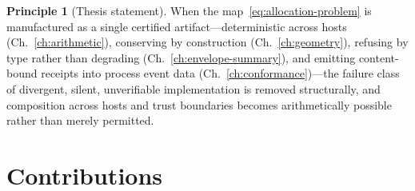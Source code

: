 \documentclass[12pt,oneside]{report}
\theoremstyle{plain}
\theoremstyle{definition}
\newtheorem{principle}[theorem]{Principle}
\theoremstyle{remark}
\begin{document}
\begin{principle}[Thesis statement]
When the map~\eqref{eq:allocation-problem} is manufactured as a single
certified artifact---deterministic across hosts
(Ch.~\ref{ch:arithmetic}), conserving by construction
(Ch.~\ref{ch:geometry}), refusing by type rather than degrading
(Ch.~\ref{ch:envelope-summary}), and emitting content-bound receipts
into process event data (Ch.~\ref{ch:conformance})---the failure class
of divergent, silent, unverifiable implementation is removed
structurally, and composition across hosts and trust boundaries becomes
arithmetically possible rather than merely permitted.
\end{principle}

\section{Contributions}
\end{document}
